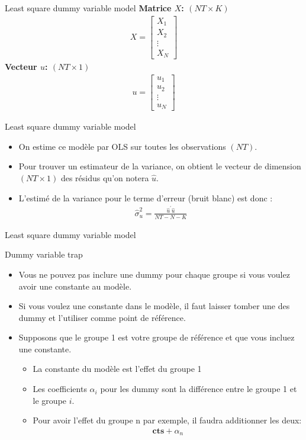 \documentclass{beamer}
\begin{document}
\begin{frame}{Least square dummy variable model}
\textbf{Matrice $X$: $(NT \times K)$}
\begin{align*}
X=\begin{bmatrix} 
X_1 \\
X_2 \\
\vdots \\
X_N
\end{bmatrix} 
\end{align*}
\textbf{Vecteur $u$: $(NT \times 1)$}
\begin{align*}
u=\begin{bmatrix} 
u_1 \\
u_2 \\
\vdots \\
u_N
\end{bmatrix} 
\end{align*}
\end{frame}

\begin{frame}{Least square dummy variable model}
\begin{itemize}
\item On estime ce modèle par OLS sur toutes les observations $(NT)$.
\item Pour trouver un estimateur de la variance, on obtient le vecteur de dimension $(NT \times 1)$ des résidus qu’on notera $\hat{u}$.
\item L’estimé de la variance pour le terme d’erreur (bruit blanc) est donc :
\begin{align*}
\hat{\sigma}_u^2=\frac{\hat{u}^{'}\hat{u}}{NT-N-K}
\end{align*}
\end{itemize}
\end{frame}

\begin{frame}{Least square dummy variable model}
\begin{block}{Dummy variable trap}
\begin{itemize}
\item Vous ne pouvez pas inclure une dummy pour chaque groupe si vous voulez avoir une constante au modèle.
\item Si vous voulez une constante dans le modèle, il faut laisser tomber une des dummy et l’utiliser comme point de référence.
\item Supposons que le groupe 1 est votre groupe de référence et que vous incluez une constante.
\begin{itemize}
\item La constante du modèle est l’effet du groupe 1 
\item Les coefficients $\alpha_i$ pour les dummy sont la différence entre le groupe 1 et le groupe $i$. 
\item  Pour avoir l’effet du groupe n par exemple, il faudra additionner les deux:
\begin{align*}
\textbf{cts}+\alpha_n
\end{align*}
\end{itemize}
\end{itemize}
\end{block}
\end{frame}
\end{document}
